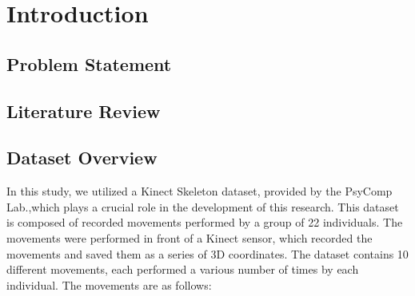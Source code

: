 %
%
\chapter{Introduction}

   
   
   \section{Problem Statement}

   

   \section{Literature Review}
   
   \section{Dataset Overview}
   In this study, we utilized a Kinect Skeleton dataset, provided by the PsyComp Lab.,which plays a crucial role in the development of this research. This dataset is composed of recorded movements performed by a group of 22 individuals. The movements were performed in front of a Kinect sensor, which recorded the movements and saved them as a series of 3D coordinates. The dataset contains 10 different movements, each performed a various number of times by each individual. The movements are as follows:

